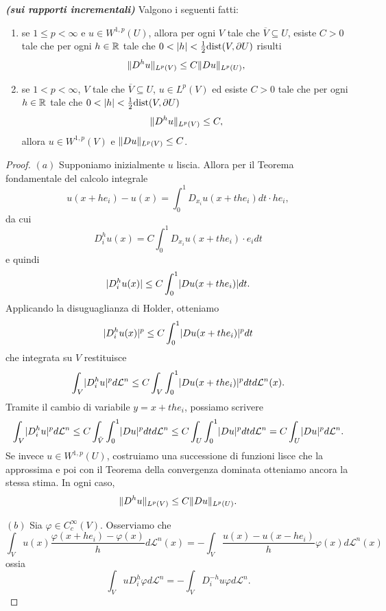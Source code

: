\begin{teorema}\textbf{\emph{(sui rapporti incrementali)}}
	Valgono i seguenti fatti:
	\begin{enumerate}[$(a)$]
		\item se $1 \le p < \infty$ e $u \in W^{1,p}(U)$, allora per ogni $V$ tale che $\overline{V} \subseteq U$, esiste $C > 0$ tale che per ogni $h \in \mathbb{R}$ tale che $0 < \lvert h\rvert< \frac{1}{2}\textup{dist}(V,\partial U)$ risulti 
		\[ \lVert D^{h}u\rVert_{L^p(V)} \le C \lVert Du\rVert_{L^p(U)}, \]
		\item se $1 < p <\infty$, $V$ tale che $\overline{V} \subseteq U$, $u \in L^p(V)$ ed esiste $C>0$ tale che per ogni $h \in \mathbb{R}$ tale che $0 < \lvert h\rvert< \frac{1}{2}\textup{dist}(V,\partial U)$
		\[ \lVert D^hu\rVert_{L^p(V)} \le C, \]
		allora $u \in W^{1,p}(V)$ e $\lVert Du\rVert_{L^p(V)} \le C$. 
	\end{enumerate}
	\begin{proof}\hfill
		\par\noindent
		$(a)$ Supponiamo inizialmente $u$ liscia. Allora per il Teorema fondamentale del calcolo integrale
		\[ u(x+he_i) - u(x) = \int_{0}^{1} D_{x_i}u(x+the_i)dt \cdot he_i,\]
		da cui 
		\[ D^h_iu(x) = C \int_{0}^{1} D_{x_i}u(x+the_i) \cdot e_i dt \]
		e quindi 
		\[ \lvert D^h_iu(x) \rvert \le C \int_{0}^{1} \lvert Du(x+the_i)\rvert dt.\]
		Applicando la disuguaglianza di Holder, otteniamo 
		\[ \lvert D^h_iu(x) \rvert^p \le C\int_{0}^{1} \lvert Du(x+the_i)\rvert^p dt\]
		che integrata su $V$ restituisce
		\[ \int_V \lvert D^h_iu \rvert^p d\mathcal{L}^n\le C\int_V \int_{0}^{1} \lvert Du(x+the_i)\rvert^p dt d\mathcal{L}^n(x).\]
		Tramite il cambio di variabile $y = x+the_i$, possiamo scrivere
		\[ \int_V \lvert D^h_iu \rvert^p d\mathcal{L}^n\le C\int_{\tilde{V}} \int_{0}^{1} \lvert Du\rvert^p dt d\mathcal{L}^n \le C\int_U \int_{0}^{1} \lvert Du\rvert^p dt d\mathcal{L}^n = C\int_U \lvert Du\rvert^p d\mathcal{L}^n.\]
		Se invece $u \in W^{1,p}(U)$, costruiamo una successione di funzioni lisce che la approssima e poi con il Teorema della convergenza dominata otteniamo ancora la stessa stima. In ogni caso,
		\[ \lVert D^{h}u\rVert_{L^p(V)} \le C \lVert Du\rVert_{L^p(U)}. \]
		\par\noindent
		$(b)$ Sia $\varphi \in C^\infty_c(V)$. Osserviamo che 
		\[ \int_V u(x) \dfrac{\varphi(x+he_i) - \varphi(x)}{h} d\mathcal{L}^n(x) = - \int_V \dfrac{u(x)-u(x-he_i)}{h} \varphi(x) d\mathcal{L}^n(x)\]
		ossia 
		\begin{equation}\label{integrazioneperpartirapportoincrementale}
			\int_V u D^h_i\varphi d\mathcal{L}^n =-\int_V D^{-h}_iu \varphi d\mathcal{L}^n.
		\end{equation}

\end{proof}
\end{teorema}
